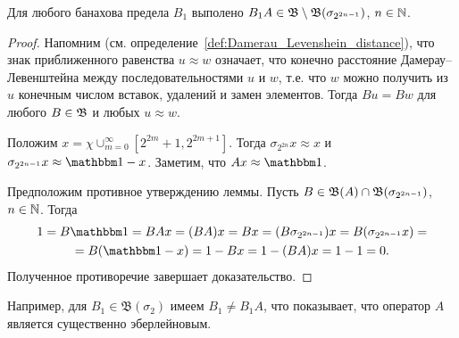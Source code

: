\begin{lemma}
	Для любого банахова предела $B_1$ выполено $B_1 A \in \mathfrak B \setminus \mathfrak{B} (\sigma_{2^{2n-1}})$, $n\in \mathbb{N}$.
\end{lemma}

\begin{proof}
	Напомним (см. определение~\ref{def:Damerau_Levenshein_distance}), что знак приближенного равенства $ u \approx w$ означает,
	что конечно расстояние Дамерау--Левенштейна между последовательностями
	$u$ и $w$,
	т.е. что $w$ можно получить из $u$ конечным числом вставок, удалений и замен элементов.
	Тогда $Bu = Bw$ для любого $B\in\mathfrak{B}$ и любых $u \approx w$.

	Положим $x = \chi {\cup_{m=0}^{\infty}\left[2^{2 m}+1, 2^{2 m+1}\right]}$.
	Тогда $\sigma_{2^{2n}} x \approx x$ и $\sigma_{2^{2n-1}} x \approx \one - x$.
	Заметим, что $Ax \approx \one$.

	Предположим противное утверждению леммы.
	Пусть $B \in \mathfrak{B}(A) \cap \mathfrak{B} (\sigma_{2^{2n-1}})$, $n\in \mathbb{N}$.
	Тогда
	\begin{multline}
		1 = B\one = BAx = (BA)x = Bx =
		(B\sigma_{2^{2n-1}}) x = B (\sigma_{2^{2n-1}} x) =
		\\=
		B(\one -x) = 1 - Bx = 1 - (BA)x = 1-1 = 0
		.
	\end{multline}
	Полученное противоречие завершает доказательство.
\end{proof}

\begin{remark}
	Например, для $B_1 \in \mathfrak B (\sigma_2)$ имеем $B_1 \ne B_1 A$, что показывает,
	что оператор $A$ является существенно эберлейновым.
\end{remark}


